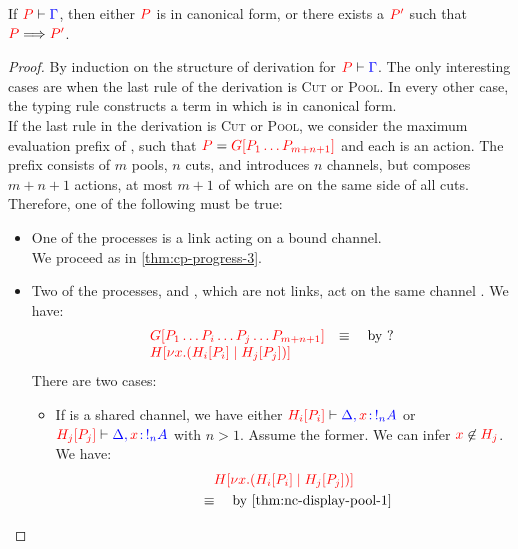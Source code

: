 \begin{theorem}[Progress]\label{thm:nc-progress}
  If $\seq[{ P }]{ \Gamma }$, then either $\tm{P}$ is in canonical form, or
  there exists a $\tm{P'}$ such that $\reducesto{P}{P'}$. 
\end{theorem}
\begin{proof}
  By induction on the structure of derivation for $\seq[{ P }]{ \Gamma }$.
  The only interesting cases are when the last rule of the derivation is
  \textsc{Cut} or \textsc{Pool}. In every other case, the typing rule constructs
  a term in which is in canonical form. 
  \\
  If the last rule in the derivation is \textsc{Cut} or \textsc{Pool}, we
  consider the maximum evaluation prefix  of , such that $\tm{P} =
  \tm{\cpPlug{G}{P_1 \dots P_{m+n+1}}}$ and each  is an action.
  The prefix  consists of $m$ pools, $n$ cuts, and introduces $n$
  channels, but composes $m+n+1$ actions, at most $m+1$ of which are on the same
  side of all cuts.
  Therefore, one of the following must be true:
  \begin{itemize}
  \item
    One of the processes is a link  acting on a bound channel.
    \\
    We proceed as in \cref{thm:cp-progress-3}. 
  \item
    Two of the processes,  and , which are not links, act on the
    same channel . We have:
    \begin{gather*}
      \begin{array}{ll}
        \tm{\cpPlug{G}{P_1 \dots P_i \dots P_j \dots P_{m+n+1}}}
        & \equiv \quad \text{by ?} \\
        \tm{\cpPlug{H}{\cpCut{x}{\cpPlug{H_i}{P_i}}{\cpPlug{H_j}{P_j}}}}
      \end{array}
    \end{gather*}
    There are two cases:
    \begin{itemize}
    \item
      If  is a shared channel, we have either
      $\seq[{\cpPlug{H_i}{P_i}}]{ \Delta, \tmty{x}{\take[n]{A} }}$ or
      $\seq[{\cpPlug{H_j}{P_j}}]{ \Delta, \tmty{x}{\take[n]{A} }}$ with $n > 1$.
      Assume the former. 
      We can infer $\notFreeIn{x}{H_j}$.
      We have:
      \begin{gather*}
        \tm{\cpPlug{H}{\cpCut{x}{\cpPlug{H_i}{P_i}}{\cpPlug{H_j}{P_j}}}} \\
        \qquad \equiv \quad \text{by \cref{thm:nc-display-pool-1}} \\

\end{gather*}
\end{itemize}
\end{itemize}
\end{proof}
